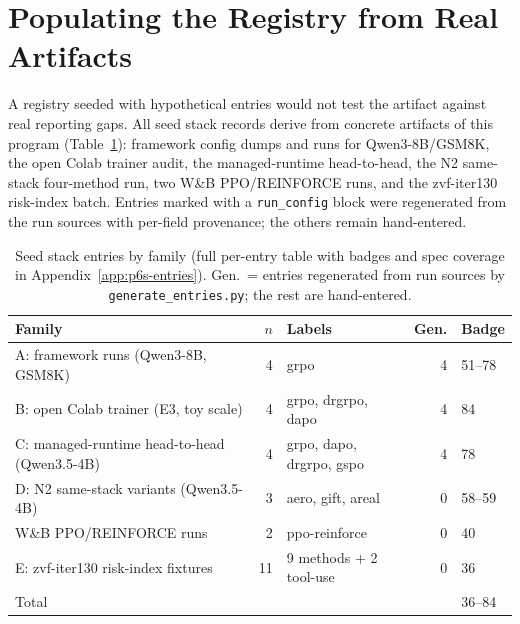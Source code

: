 \section{Populating the Registry from Real Artifacts}
\label{sec:p6-population}

A registry seeded with hypothetical entries would not test the artifact against
real reporting gaps. All \NSTACK{} seed stack records derive from concrete
artifacts of this program (Table~\ref{tab:p6-entries-summary}): framework config dumps
and runs for Qwen3-8B/GSM8K, the open Colab trainer audit, the managed-runtime
head-to-head, the N2 same-stack four-method run, two W\&B PPO/REINFORCE runs,
and the zvf-iter130 risk-index batch. Entries marked with a \texttt{run\_config}
block were regenerated from the run sources with per-field provenance; the
others remain hand-entered.

\begin{table}[t]
\centering
\caption{Seed stack entries by family (full per-entry table with badges and
spec coverage in Appendix~\ref{app:p6s-entries}). Gen.\ = entries regenerated
from run sources by \texttt{generate\_entries.py}; the rest are hand-entered.}
\label{tab:p6-entries-summary}
\small
\begin{tabular}{@{}lrlrl@{}}
\toprule
Family & $n$ & Labels & Gen. & Badge \\
\midrule
A: framework runs (Qwen3-8B, GSM8K) & 4 & grpo & 4 & 51--78 \\
B: open Colab trainer (E3, toy scale) & 4 & grpo, drgrpo, dapo & 4 & 84 \\
C: managed-runtime head-to-head (Qwen3.5-4B) & 4 & grpo, dapo, drgrpo, gspo & 4 & 78 \\
D: N2 same-stack variants (Qwen3.5-4B) & 3 & aero, gift, areal & 0 & 58--59 \\
W\&B PPO/REINFORCE runs & 2 & ppo-reinforce & 0 & 40 \\
E: zvf-iter130 risk-index fixtures & 11 & 9 methods + 2 tool-use & 0 & 36 \\
\midrule
Total & \NSTACK{} & & \NGEN{} & 36--84 \\
\bottomrule
\end{tabular}
\end{table}

